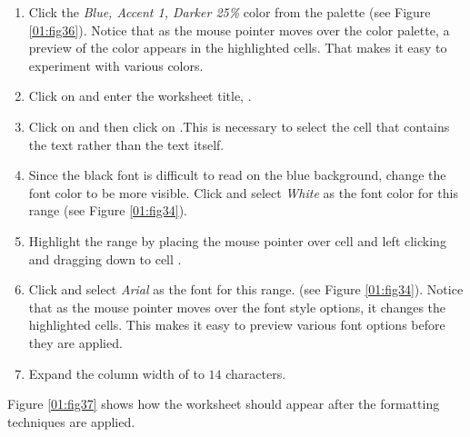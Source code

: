 \begin{enumerate}[resume]
	\item Click the \textit{Blue, Accent 1, Darker 25\%} color from the palette (see Figure \ref{01:fig36}). Notice that as the mouse pointer moves over the color palette, a preview of the color appears in the highlighted cells. That makes it easy to experiment with various colors.
	\item Click on  and enter the worksheet title, .
	\item Click on  and then click on .This is necessary to select the cell that contains the text rather than the text itself.
	\item Since the black font is difficult to read on the blue background, change the font color to be more visible. Click  and select \textit{White} as the font color for this range (see Figure \ref{01:fig34}).
	\item Highlight the range  by placing the mouse pointer over cell  and left clicking and dragging down to cell .
	\item Click  and select \textit{Arial} as the font for this range. (see Figure \ref{01:fig34}). Notice that as the mouse pointer moves over the font style options, it changes the highlighted cells. This makes it easy to preview various font options before they are applied.
	\item Expand the column width of  to $ 14 $ characters.
\end{enumerate}

Figure \ref{01:fig37} shows how the  worksheet should appear after the formatting techniques are applied.

